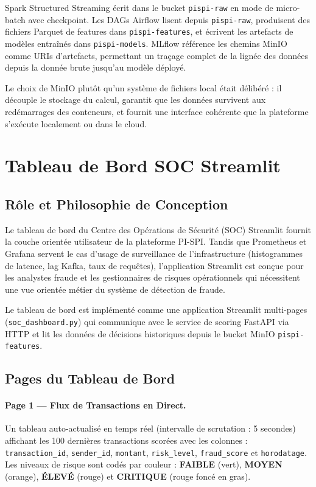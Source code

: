 \documentclass[12pt,a4paper,oneside]{book}
\theoremstyle{definition}
\theoremstyle{plain}
\begin{document}
Spark Structured Streaming écrit dans le bucket \texttt{pispi-raw} en mode de micro-batch avec checkpoint. Les DAGs Airflow lisent depuis \texttt{pispi-raw}, produisent des fichiers Parquet de features dans \texttt{pispi-features}, et écrivent les artefacts de modèles entraînés dans \texttt{pispi-models}. MLflow référence les chemins MinIO comme URIs d'artefacts, permettant un traçage complet de la lignée des données depuis la donnée brute jusqu'au modèle déployé.

Le choix de MinIO plutôt qu'un système de fichiers local était délibéré : il découple le stockage du calcul, garantit que les données survivent aux redémarrages des conteneurs, et fournit une interface cohérente que la plateforme s'exécute localement ou dans le cloud.

\section{Tableau de Bord SOC Streamlit}

\subsection{Rôle et Philosophie de Conception}

Le tableau de bord du Centre des Opérations de Sécurité (SOC) Streamlit fournit la couche orientée utilisateur de la plateforme PI-SPI. Tandis que Prometheus et Grafana servent le cas d'usage de surveillance de l'infrastructure (histogrammes de latence, lag Kafka, taux de requêtes), l'application Streamlit est conçue pour les analystes fraude et les gestionnaires de risques opérationnels qui nécessitent une vue orientée métier du système de détection de fraude.

Le tableau de bord est implémenté comme une application Streamlit multi-pages (\texttt{soc\_dashboard.py}) qui communique avec le service de scoring FastAPI via HTTP et lit les données de décisions historiques depuis le bucket MinIO \texttt{pispi-features}.

\subsection{Pages du Tableau de Bord}

\paragraph{Page 1 — Flux de Transactions en Direct.}
Un tableau auto-actualisé en temps réel (intervalle de scrutation : 5 secondes) affichant les 100 dernières transactions scorées avec les colonnes : \texttt{transaction\_id}, \texttt{sender\_id}, \texttt{montant}, \texttt{risk\_level}, \texttt{fraud\_score} et \texttt{horodatage}. Les niveaux de risque sont codés par couleur : \textcolor{aimsgreen}{\textbf{FAIBLE}} (vert), \textcolor{warnorange}{\textbf{MOYEN}} (orange), \textcolor{alertred}{\textbf{ÉLEVÉ}} (rouge) et \textcolor{alertred}{\textbf{CRITIQUE}} (rouge foncé en gras).
\end{document}
